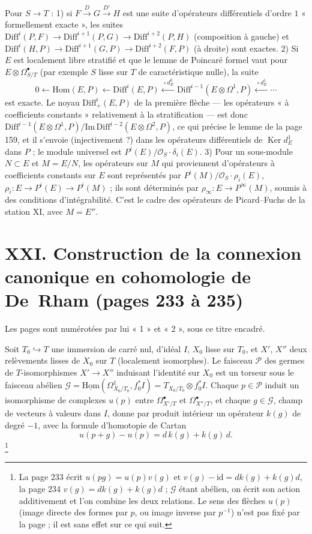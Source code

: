 \documentclass[11pt,a4paper]{article}
\begin{document}
Pour $S \to T$ : 1) si $F \xrightarrow{D} G \xrightarrow{D'} H$ est une suite
d'opérateurs différentiels d'ordre $1$ « formellement exacte », les suites
$\mathrm{Diff}^i(P,F) \to \mathrm{Diff}^{i+1}(P,G) \to \mathrm{Diff}^{i+2}(P,H)$
(composition à gauche) et $\mathrm{Diff}^i(H,P) \to \mathrm{Diff}^{i+1}(G,P) \to
\mathrm{Diff}^{i+2}(F,P)$ (à droite) sont exactes. 2) Si $E$ est localement libre
stratifié et que le lemme de Poincaré formel vaut pour $E \otimes
\Omega^\bullet_{S/T}$ (par exemple $S$ lisse sur $T$ de caractéristique nulle),
la suite
\[
  0 \leftarrow \mathrm{Hom}(E,P) \leftarrow \mathrm{Diff}^i(E,P)
  \xleftarrow{\,\circ d^0_E\,} \mathrm{Diff}^{i-1}(E \otimes \Omega^1, P)
  \xleftarrow{\,\circ d^1_E\,} \cdots
\]
est exacte. Le noyau $\mathrm{Diff}^i_+(E,P)$ de la première flèche — les
opérateurs « à coefficients constants » relativement à la stratification —
est donc $\mathrm{Diff}^{i-1}(E\otimes\Omega^1,P)/\mathrm{Im}\,\mathrm{Diff}^{i-2}(E
\otimes\Omega^2,P)$, ce qui précise le lemme de la page 159, et il s'envoie
(injectivement ?) dans les opérateurs différentiels de $\operatorname{Ker} d^1_E$
dans $P$ ; le module universel est $P^i(E)/\mathcal{O}_S\cdot\delta_i(E)$. 3) Pour
un sous-module $N \subset E$ et $M = E/N$, les opérateurs sur $M$ qui
proviennent d'opérateurs à coefficients constants sur $E$ sont représentés
par $P^i(M)/\mathcal{O}_S\cdot\rho_i(E)$, $\rho_i : E \to P^i(E) \to P^i(M)$ ; ils
sont déterminés par $\rho_\infty : E \to P^\infty(M)$, soumis à des conditions
d'intégrabilité. C'est le cadre des opérateurs de Picard--Fuchs de la
station XI, avec $M = E''$.

\section*{XXI. Construction de la connexion canonique en cohomologie de De~Rham (pages 233 à 235)}

Les pages sont numérotées par lui « 1 » et « 2 », sous ce titre encadré.

Soit $T_0 \hookrightarrow T$ une immersion de carré nul, d'idéal $I$, $X_0$ lisse
sur $T_0$, et $X'$, $X''$ deux relèvements lisses de $X_0$ sur $T$
(localement isomorphes). Le faisceau $\mathcal{P}$ des germes de
$T$-isomorphismes $X' \to X''$ induisant l'identité sur $X_0$ est un torseur
sous le faisceau abélien $\mathcal{G} = \underline{\mathrm{Hom}}(\Omega^1_{X_0/T_0},
f_0^*I) = T_{X_0/T_0} \otimes f_0^*I$. Chaque $p \in \mathcal{P}$ induit un
isomorphisme de complexes $u(p)$ entre $\Omega^\bullet_{X'/T}$ et
$\Omega^\bullet_{X''/T}$, et chaque $g \in \mathcal{G}$, champ de vecteurs à
valeurs dans $I$, donne par produit intérieur un opérateur $k(g)$ de degré
$-1$, avec la formule d'homotopie de Cartan
\[
  u(p + g) - u(p) = d\,k(g) + k(g)\,d .
\]
\footnote{La page 233 écrit $u(pg) = u(p)v(g)$ et $v(g) - \mathrm{id} = dk(g) +
k(g)d$, la page 234 $v(g) = dk(g) + k(g)d$ ; $\mathcal{G}$ étant abélien, on
écrit son action additivement et l'on combine les deux relations. Le sens
des flèches $u(p)$ (image directe des formes par $p$, ou image inverse par
$p^{-1}$) n'est pas fixé par la page ; il est sans effet sur ce qui suit.}
\end{document}
